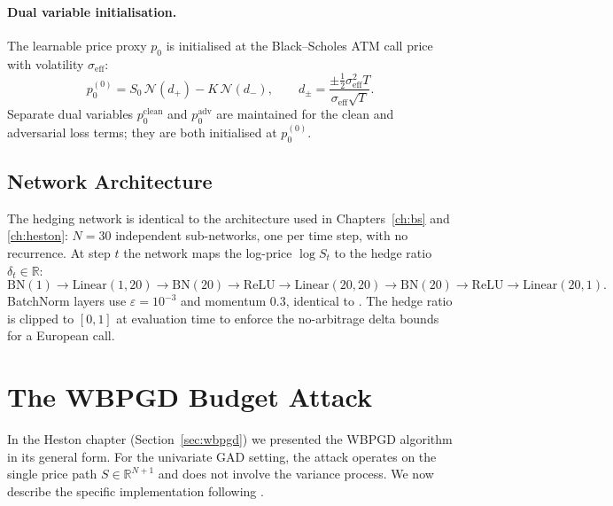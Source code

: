 \paragraph{Dual variable initialisation.}
The learnable price proxy $p_0$ is initialised at the Black--Scholes ATM call
price with volatility $\sigma_{\mathrm{eff}}$:
\begin{equation}
  p_0^{(0)}
  = S_0\,\mathcal{N}(d_+) - K\,\mathcal{N}(d_-),
  \qquad
  d_\pm = \frac{\pm \tfrac{1}{2}\sigma_{\mathrm{eff}}^2 T}
               {\sigma_{\mathrm{eff}}\sqrt{T}}.
  \label{eq:p0_init}
\end{equation}
Separate dual variables $p_0^{\mathrm{clean}}$ and $p_0^{\mathrm{adv}}$ are
maintained for the clean and adversarial loss terms; they are both initialised
at $p_0^{(0)}$.

\subsection{Network Architecture}

The hedging network is identical to the architecture used in
Chapters~\ref{ch:bs} and \ref{ch:heston}: $N = 30$ independent sub-networks,
one per time step, with no recurrence.  At step $t$ the network maps the
log-price $\log S_t$ to the hedge ratio $\delta_t \in \mathbb{R}$:
\begin{equation*}
  \mathrm{BN}(1)
  \to \mathrm{Linear}(1, 20)
  \to \mathrm{BN}(20)
  \to \mathrm{ReLU}
  \to \mathrm{Linear}(20, 20)
  \to \mathrm{BN}(20)
  \to \mathrm{ReLU}
  \to \mathrm{Linear}(20, 1).
\end{equation*}
BatchNorm layers use $\varepsilon = 10^{-3}$ and momentum $0.3$, identical to
\citet{he2025}.  The hedge ratio is clipped to $[0, 1]$ at evaluation time to
enforce the no-arbitrage delta bounds for a European call.

\section{The WBPGD Budget Attack}%
\label{sec:gad_attack}

In the Heston chapter (Section~\ref{sec:wbpgd}) we presented the WBPGD
algorithm in its general form.  For the univariate GAD setting, the attack
operates on the single price path $S \in \mathbb{R}^{N+1}$ and does not
involve the variance process.  We now describe the specific implementation
following \citet{he2025}.

